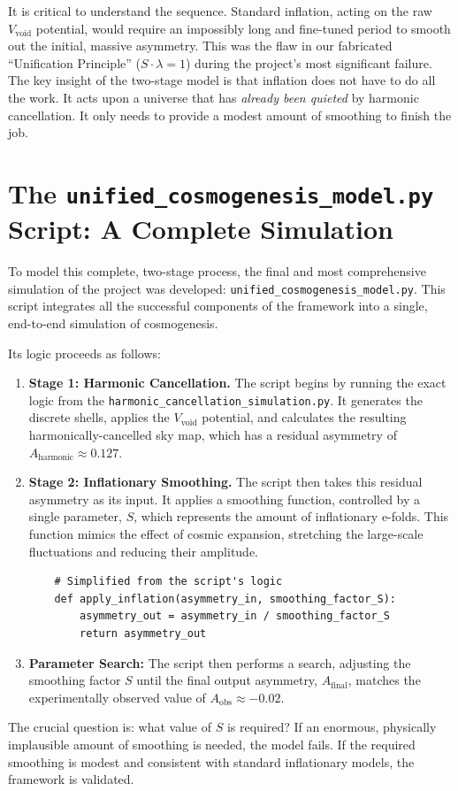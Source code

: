 \documentclass[12pt]{report}
\begin{document}
It is critical to understand the sequence. Standard inflation, acting on the raw $V_{\text{void}}$ potential, would require an impossibly long and fine-tuned period to smooth out the initial, massive asymmetry. This was the flaw in our fabricated ``Unification Principle'' ($S \cdot \lambda = 1$) during the project's most significant failure. The key insight of the two-stage model is that inflation does not have to do all the work. It acts upon a universe that has \textit{already been quieted} by harmonic cancellation. It only needs to provide a modest amount of smoothing to finish the job.

\section{The \texttt{unified\_cosmogenesis\_model.py} Script: A Complete Simulation}
To model this complete, two-stage process, the final and most comprehensive simulation of the project was developed: \texttt{unified\_cosmogenesis\_model.py}. This script integrates all the successful components of the framework into a single, end-to-end simulation of cosmogenesis.

Its logic proceeds as follows:
\begin{enumerate}
    \item \textbf{Stage 1: Harmonic Cancellation.} The script begins by running the exact logic from the \texttt{harmonic\_cancellation\_simulation.py}. It generates the discrete shells, applies the $V_{\text{void}}$ potential, and calculates the resulting harmonically-cancelled sky map, which has a residual asymmetry of $A_{\text{harmonic}} \approx 0.127$.
    \item \textbf{Stage 2: Inflationary Smoothing.} The script then takes this residual asymmetry as its input. It applies a smoothing function, controlled by a single parameter, $S$, which represents the amount of inflationary e-folds. This function mimics the effect of cosmic expansion, stretching the large-scale fluctuations and reducing their amplitude.
    \begin{verbatim}
    # Simplified from the script's logic
    def apply_inflation(asymmetry_in, smoothing_factor_S):
        asymmetry_out = asymmetry_in / smoothing_factor_S
        return asymmetry_out
    \end{verbatim}
    \item \textbf{Parameter Search:} The script then performs a search, adjusting the smoothing factor $S$ until the final output asymmetry, $A_{\text{final}}$, matches the experimentally observed value of $A_{\text{obs}} \approx -0.02$.
\end{enumerate}
The crucial question is: what value of $S$ is required? If an enormous, physically implausible amount of smoothing is needed, the model fails. If the required smoothing is modest and consistent with standard inflationary models, the framework is validated.
\end{document}
